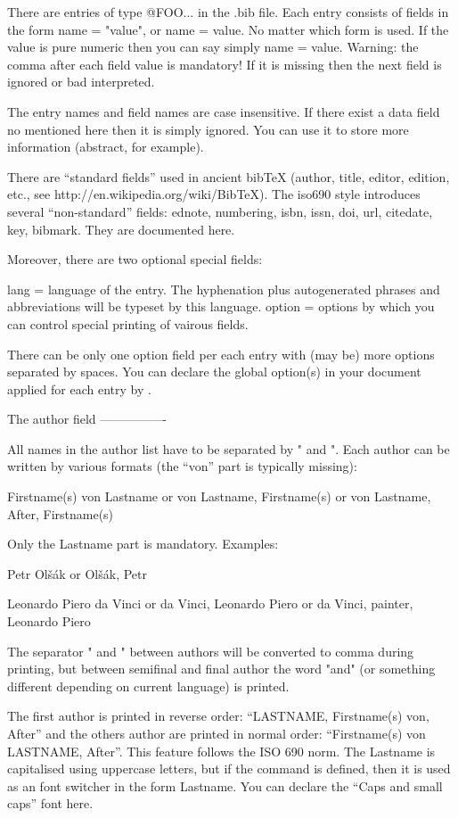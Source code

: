There are entries of type @FOO{...} in the .bib file. Each entry consists of
fields in the form name = "value", or name = {value}. No matter which form is
used. If the value is pure numeric then you can say simply name = value.
Warning: the comma after each field value is mandatory! If it is missing then the
next field is ignored or bad interpreted.

The entry names and field names are case insensitive. If there exist a data
field no mentioned here then it is simply ignored. You can use it to store
more information (abstract, for example).

There are ``standard fields'' used in ancient bibTeX (author, title, editor, edition,
etc., see http://en.wikipedia.org/wiki/BibTeX). The iso690 style introduces
several ``non-standard'' fields: ednote, numbering, isbn, issn, doi, url, 
citedate, key, bibmark. They are documented here.

Moreover, there are two optional special fields:

lang     = language of the entry. The hyphenation plus autogenerated phrases and
           abbreviations will be typeset by this language.
option   = options by which you can control special printing of vairous fields.

There can be only one option field per each entry with (may be) more options
separated by spaces. You can declare the global option(s) in your document
applied for each entry by \def\biboptions{...}.


The author field
----------------

All names in the author list have to be separated by " and ". Each author
can be written by various formats (the ``von'' part is typically missing):

  Firstname(s) von Lastname
  or
  von Lastname, Firstname(s)
  or
  von Lastname, After, Firstname(s)

Only the Lastname part is mandatory. Examples:

  Petr Olšák
  or
  Olšák, Petr

  Leonardo Piero da Vinci
  or
  da Vinci, Leonardo Piero
  or
  da Vinci, painter, Leonardo Piero

The separator " and " between authors will be converted to comma during
printing, but between semifinal and final author the word "and" (or something
different depending on current language) is printed.

The first author is printed in reverse order: ``LASTNAME, Firstname(s) von,
After'' and the others author are printed in normal order: ``Firstname(s)
von LASTNAME, After''. This feature follows the ISO 690 norm. The Lastname
is capitalised using uppercase letters, but if the \sc command is defined,
then it is used as an font switcher in the form {\sc Lastname}. You can
declare the ``Caps and small caps'' font here.

